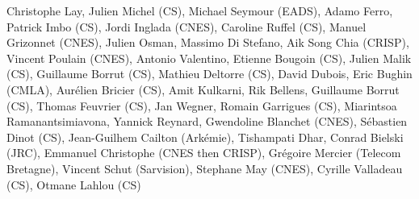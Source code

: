 Christophe Lay, Julien Michel (CS), Michael Seymour (EADS), Adamo Ferro, Patrick Imbo (CS), Jordi Inglada (CNES), Caroline Ruffel (CS), Manuel Grizonnet (CNES), Julien Osman, Massimo Di Stefano, Aik Song Chia (CRISP), Vincent Poulain (CNES), Antonio Valentino, Etienne Bougoin (CS), Julien Malik (CS), Guillaume Borrut (CS), Mathieu Deltorre (CS), David Dubois, Eric Bughin (CMLA), Aur\'elien Bricier (CS), Amit Kulkarni, Rik Bellens, Guillaume Borrut (CS), Thomas Feuvrier (CS), Jan Wegner, Romain Garrigues (CS), Miarintsoa Ramanantsimiavona, Yannick Reynard, Gwendoline Blanchet (CNES), S\'ebastien Dinot (CS), Jean-Guilhem Cailton (Ark\'emie), Tishampati Dhar, Conrad Bielski (JRC), Emmanuel Christophe (CNES then CRISP), Gr\'egoire Mercier (Telecom Bretagne), Vincent Schut (Sarvision), Stephane May (CNES), Cyrille Valladeau (CS), Otmane Lahlou (CS)